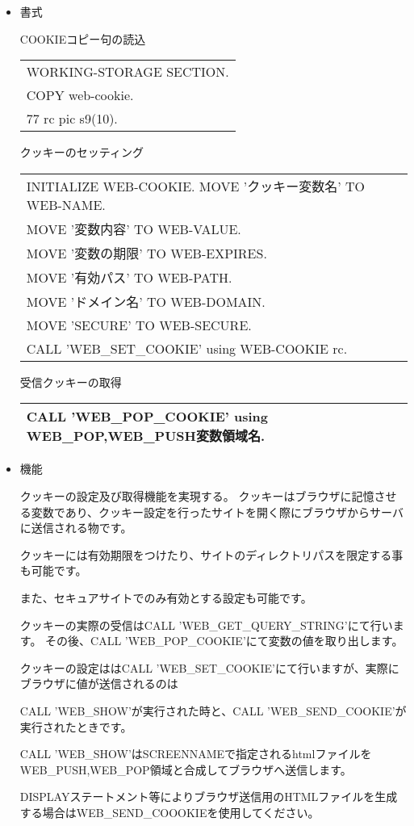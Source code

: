 
\begin{itemize}
\item{書式}

{\gt COOKIEコピー句の読込}

\begin{tabular}{|l|}
\hline
WORKING-STORAGE SECTION.\\
COPY web-cookie.\\
77  rc  pic s9(10).\\
\hline
\end{tabular}

{\gt クッキーのセッティング}

\begin{tabular}{|l|}
\hline
INITIALIZE WEB-COOKIE.
MOVE 'クッキー変数名' TO WEB-NAME.\\
MOVE '変数内容'       TO WEB-VALUE.\\
MOVE '変数の期限'     TO WEB-EXPIRES.\\
MOVE '有効パス'       TO WEB-PATH.\\
MOVE 'ドメイン名'     TO WEB-DOMAIN.\\
MOVE 'SECURE'         TO WEB-SECURE.\\
CALL 'WEB\_SET\_COOKIE' using WEB-COOKIE rc.\\
\hline
\end{tabular}

{\gt 受信クッキーの取得}

\begin{tabular}{|l|}
\hline
CALL 'WEB\_POP\_COOKIE' using WEB\_POP,WEB\_PUSH変数領域名.\\
\hline
\end{tabular}

\item{機能}

クッキーの設定及び取得機能を実現する。
クッキーはブラウザに記憶させる変数であり、クッキー設定を行ったサイトを開く際にブラウザからサーバに送信される物です。

クッキーには有効期限をつけたり、サイトのディレクトリパスを限定する事も可能です。

また、セキュアサイトでのみ有効とする設定も可能です。

クッキーの実際の受信はCALL 'WEB\_GET\_QUERY\_STRING'にて行います。
その後、CALL 'WEB\_POP\_COOKIE'にて変数の値を取り出します。

クッキーの設定ははCALL 'WEB\_SET\_COOKIE'にて行いますが、実際にブラウザに値が送信されるのは

CALL 'WEB\_SHOW'が実行された時と、CALL 'WEB\_SEND\_COOKIE'が実行されたときです。

CALL 'WEB\_SHOW'はSCREENNAMEで指定されるhtmlファイルをWEB\_PUSH,WEB\_POP領域と合成してブラウザへ送信します。

DISPLAYステートメント等によりブラウザ送信用のHTMLファイルを生成する場合はWEB\_SEND\_COOOKIEを使用してください。

\vspace{1em}


\end{itemize}



